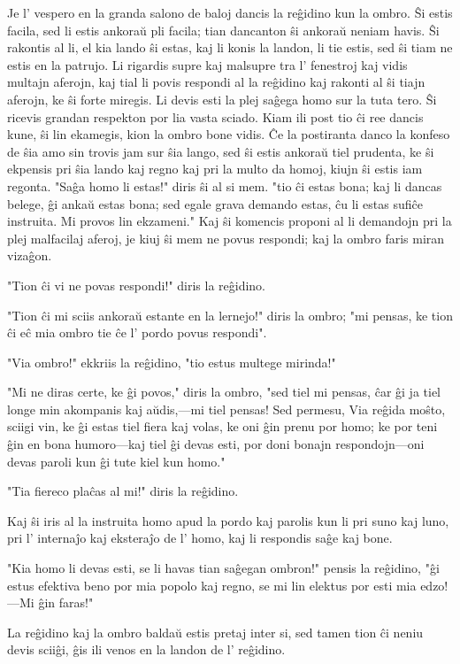 Je l' vespero en la granda salono de baloj dancis la reĝidino kun la ombro. Ŝi estis facila, sed li estis ankoraŭ pli facila; tian dancanton ŝi ankoraŭ neniam havis. Ŝi rakontis al li, el kia lando ŝi estas, kaj li konis la landon, li tie estis, sed ŝi tiam ne estis en la patrujo. Li rigardis supre kaj malsupre tra l' fenestroj kaj vidis multajn aferojn, kaj tial li povis respondi al la reĝidino kaj rakonti al ŝi tiajn aferojn, ke ŝi forte miregis. Li devis esti la plej saĝega homo sur la tuta tero. Ŝi ricevis grandan respekton por lia vasta sciado. Kiam ili post tio ĉi ree dancis kune, ŝi lin ekamegis, kion la ombro bone vidis. Ĉe la postiranta danco la konfeso de ŝia amo sin trovis jam sur ŝia lango, sed ŝi estis ankoraŭ tiel prudenta, ke ŝi ekpensis pri ŝia lando kaj regno kaj pri la multo da homoj, kiujn ŝi estis iam regonta. "Saĝa homo li estas!" diris ŝi al si mem. "tio ĉi estas bona; kaj li dancas belege, ĝi ankaŭ estas bona; sed egale grava demando estas, ĉu li estas sufiĉe instruita. Mi provos lin ekzameni." Kaj ŝi komencis proponi al li demandojn pri la plej malfacilaj aferoj, je kiuj ŝi mem ne povus respondi; kaj la ombro faris miran vizaĝon.

"Tion ĉi vi ne povas respondi!" diris la reĝidino.

"Tion ĉi mi sciis ankoraŭ estante en la lernejo!" diris la ombro; "mi pensas, ke tion ĉi eĉ mia ombro tie ĉe l' pordo povus respondi".

"Via ombro!" ekkriis la reĝidino, "tio estus multege mirinda!"

"Mi ne diras certe, ke ĝi povos," diris la ombro, "sed tiel mi pensas, ĉar ĝi ja tiel longe min akompanis kaj aŭdis,---mi tiel pensas! Sed permesu, Via reĝida moŝto, sciigi vin, ke ĝi estas tiel fiera kaj volas, ke oni ĝin prenu por homo; ke por teni ĝin en bona humoro---kaj tiel ĝi devas esti, por doni bonajn respondojn---oni devas paroli kun ĝi tute kiel kun homo."

"Tia fiereco plaĉas al mi!" diris la reĝidino.

Kaj ŝi iris al la instruita homo apud la pordo kaj parolis kun li pri suno kaj luno, pri l' internaĵo kaj eksteraĵo de l' homo, kaj li respondis saĝe kaj bone.

"Kia homo li devas esti, se li havas tian saĝegan ombron!" pensis la reĝidino, "ĝi estus efektiva beno por mia popolo kaj regno, se mi lin elektus por esti mia edzo!---Mi ĝin faras!"

La reĝidino kaj la ombro baldaŭ estis pretaj inter si, sed tamen tion ĉi neniu devis sciiĝi, ĝis ili venos en la landon de l' reĝidino.

